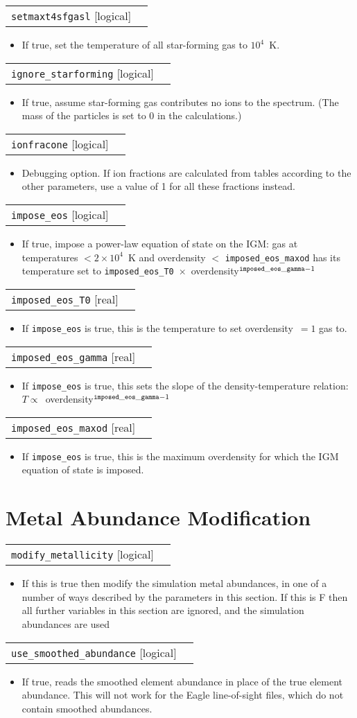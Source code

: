 \documentclass{report}
\makeatletter
\newcommand{\paramdefinition}[3]{
\begin{tabular*}{\textwidth}{l@{\extracolsep{\fill}}r}
		{\tt #1} [{\sc #2}]& #3 \\
\end{tabular*}}
\newcommand{\paramdescription}[1]{
\begin{itemize}
\item #1
\end{itemize}\vspace{0.2cm}}
\newcommand{\param}[1]{{\tt #1}}
\makeatother
\begin{document}
\paramdefinition{setmaxt4sfgasl}{logical}{}
\paramdescription{If true, set the temperature of all star-forming gas to $10^{4}$~K.}

\paramdefinition{ignore\_starforming}{logical}{}
\paramdescription{If true, assume star-forming gas contributes no ions to the spectrum. (The mass of the particles is set to 0 in the calculations.)}

\paramdefinition{ionfracone}{logical}{}
\paramdescription{Debugging option. If ion fractions are calculated from tables according to the other parameters, use a value of 1 for all these fractions instead.}

\paramdefinition{impose\_eos}{logical}{}
\paramdescription{If true, impose a power-law equation of state on the IGM: gas at temperatures $< 2 \times 10^{4}$~K and overdensity $<$ \param{imposed\_eos\_maxod} has its temperature set to \param{imposed\_eos\_T0}~$\times$~overdensity$^{\param{imposed\_eos\_gamma}-1}$}

\paramdefinition{imposed\_eos\_T0}{real}{}
\paramdescription{If \param{impose\_eos} is true, this is the temperature to set overdensity~$=1$ gas to.}

\paramdefinition{imposed\_eos\_gamma}{real}{}
\paramdescription{If \param{impose\_eos} is true, this sets the slope of the density-temperature relation: $T \propto $~overdensity$^{\param{imposed\_eos\_gamma} - 1}$}

\paramdefinition{imposed\_eos\_maxod}{real}{}
\paramdescription{If \param{impose\_eos} is true, this is the maximum overdensity for which the IGM equation of state is imposed.}



\section{Metal Abundance Modification}

\paramdefinition{modify\_metallicity}{logical}{ }
\paramdescription{If this is true then modify the simulation metal abundances, in one of a number of ways described by the parameters in this section.  If this is F then all further variables in this section are ignored, and the simulation abundances are used}

\paramdefinition{use\_smoothed\_abundance}{logical}{}
\paramdescription{If true, reads the smoothed element abundance in place of the true element abundance. This will not work for the Eagle line-of-sight files, which do not contain smoothed abundances.}
\end{document}
